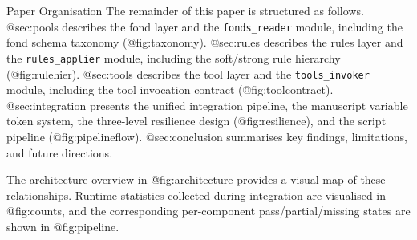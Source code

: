 \documentclass[
  ignorenonframetext,
]{beamer}
\begin{document}
\begin{frame}{Paper Organisation}
\protect{}\label{paper-organisation}
The remainder of this paper is structured as follows. @sec:pools
describes the fond layer and the \texttt{fonds\_reader} module,
including the fond schema taxonomy (@fig:taxonomy). @sec:rules describes
the rules layer and the \texttt{rules\_applier} module, including the
soft/strong rule hierarchy (@fig:rulehier). @sec:tools describes the
tool layer and the \texttt{tools\_invoker} module, including the tool
invocation contract (@fig:toolcontract). @sec:integration presents the
unified integration pipeline, the manuscript variable token system, the
three-level resilience design (@fig:resilience), and the script pipeline
(@fig:pipelineflow). @sec:conclusion summarises key findings,
limitations, and future directions.

The architecture overview in @fig:architecture provides a visual map of
these relationships. Runtime statistics collected during integration are
visualised in @fig:counts, and the corresponding per-component
pass/partial/missing states are shown in @fig:pipeline.
\end{frame}
\end{document}
